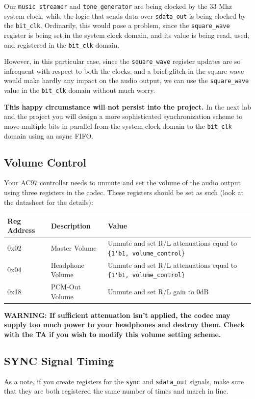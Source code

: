 \documentclass[11pt]{article}
\begin{document}
Our \verb|music_streamer| and \verb|tone_generator| are being clocked by the 33 Mhz system clock, while the logic that sends data over \verb|sdata_out| is being clocked by the \verb|bit_clk|. Ordinarily, this would pose a problem, since the \verb|square_wave| register is being set in the system clock domain, and its value is being read, used, and registered in the \verb|bit_clk| domain. 

However, in this particular case, since the \verb|square_wave| register updates are so infrequent with respect to both the clocks, and a brief glitch in the square wave would make hardly any impact on the audio output, we can use the \verb|square_wave| value in the \verb|bit_clk| domain without much worry.

\textbf{This happy circumstance will not persist into the project.} In the next lab and the project you will design a more sophisticated synchronization scheme to move multiple bits in parallel from the system clock domain to the \verb|bit_clk| domain using an async FIFO.

\subsection{Volume Control}
Your AC97 controller needs to unmute and set the volume of the audio output using three registers in the codec. These registers should be set as such (look at the datasheet for the details):

\begin{center}
	\begin{tabular}{ | l | l | p{8cm} |}
		\hline
		\textbf{Reg Address} & \textbf{Description} & \textbf{Value} \\ \hline
		0x02 & Master Volume & Unmute and set R/L attenuations equal to \verb|{1'b1, volume_control}| \\ \hline
		0x04 & Headphone Volume & Unmute and set R/L attenuations equal to \verb|{1'b1, volume_control}| \\ \hline
		0x18 & PCM-Out Volume & Unmute and set R/L gain to 0dB \\ \hline
	\end{tabular}
\end{center}

\textbf{WARNING: If sufficient attenuation isn't applied, the codec may supply too much power to your headphones and destroy them. Check with the TA if you wish to modify this volume setting scheme.}

\subsection{SYNC Signal Timing}
As a note, if you create registers for the \verb|sync| and \verb|sdata_out| signals, make sure that they are both registered the same number of times and march in line.
\end{document}
